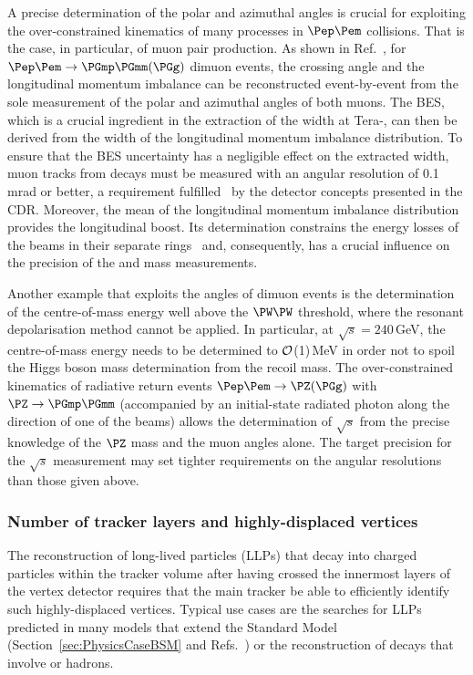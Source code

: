 A precise determination of the polar and azimuthal angles is crucial for exploiting the over-constrained kinematics of many processes in $\epem$ collisions. 
That is the case, in particular, of muon pair production.
As shown in Ref.~\cite{Blondel:2019jmp}, for $\epem \to \PGmp\PGmm (\PGg)$ dimuon events, 
the crossing angle and the longitudinal momentum imbalance can be reconstructed event-by-event from the sole measurement of the polar and azimuthal angles of both muons. 
The BES, which is a crucial ingredient in the extraction of the \PZ width at Tera-\PZ, 
can then be derived from the width of the longitudinal momentum imbalance distribution. 
To ensure that the BES uncertainty has a negligible effect on the extracted \PZ width, 
muon tracks from \PZ decays must be measured with an  angular resolution of 0.1\,mrad or better, 
a requirement fulfilled~\cite{Bacchetta:2019fmz, softwareNote} by the detector concepts presented in the CDR. 
Moreover, the mean of the longitudinal momentum imbalance distribution provides the longitudinal boost. 
Its determination constrains the energy losses of the beams in their separate rings~\cite{note_EPOL} and, consequently, 
has a crucial influence on the precision of the \PZ and \PW mass measurements.

Another example that exploits the angles of dimuon events is the determination of the centre-of-mass energy well above the $\PW\PW$ threshold, 
where the resonant depolarisation method cannot be applied. 
In particular, at $\sqrt{s} = 240$\,GeV, the centre-of-mass energy needs to be determined to ${\cal{O}}$(1)\,MeV 
in order not to spoil the Higgs boson mass determination from the recoil mass. 
The over-constrained kinematics of radiative return events $\epem \to \PZ (\PGg)$ with $\PZ \to \PGmp\PGmm$ 
(accompanied by an initial-state radiated photon along the direction of one of the beams) 
allows the determination of $\sqrt{s}$ from the precise knowledge of the $\PZ$ mass and the muon angles alone. 
The target precision for the $\sqrt{s}$ measurement may set tighter requirements on the angular resolutions than those given above.

\subsubsection{Number of tracker layers and highly-displaced vertices}
\label{sec:PhysPerf_Kshorts}

The reconstruction of long-lived particles (LLPs) that decay into charged particles within the tracker volume 
after having crossed the innermost layers of the vertex detector requires that the main tracker be able to efficiently identify such highly-displaced vertices. 
Typical use cases are the searches for LLPs predicted in many models that extend the Standard Model 
(Section~\ref{sec:PhysicsCaseBSM} and Refs.~\cite{note_HNL_Polesello_Valle_mujj,note_LLPs_ExoticHiggsDecays})
or the reconstruction of decays that involve \PKS or \PGL hadrons.

